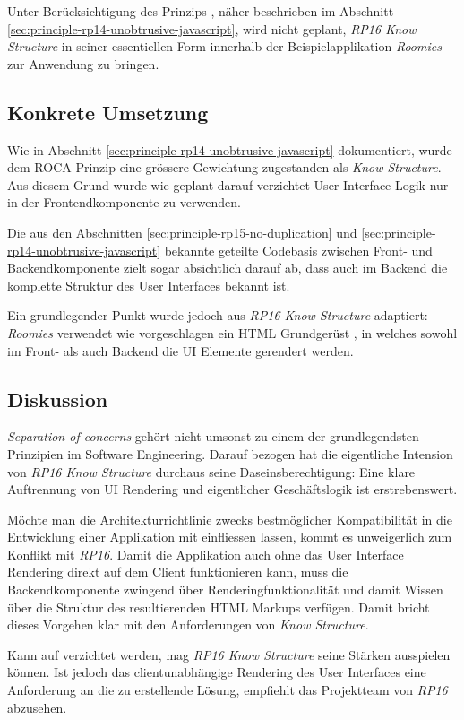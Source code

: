 Unter Berücksichtigung des Prinzips \emph{}, näher beschrieben im Abschnitt \ref{sec:principle-rp14-unobtrusive-javascript}, wird nicht geplant, \emph{RP16 Know Structure} in seiner essentiellen Form innerhalb der Beispielapplikation \emph{Roomies} zur Anwendung zu bringen.


\subsection*{Konkrete Umsetzung}

Wie in Abschnitt \ref{sec:principle-rp14-unobtrusive-javascript} dokumentiert, wurde dem ROCA Prinzip \emph{} eine grössere Gewichtung zugestanden als \emph{Know Structure}. Aus diesem Grund wurde wie geplant darauf verzichtet User Interface Logik nur in der Frontendkomponente zu verwenden.

Die aus den Abschnitten \ref{sec:principle-rp15-no-duplication} und \ref{sec:principle-rp14-unobtrusive-javascript} bekannte geteilte Codebasis zwischen Front- und Backendkomponente zielt sogar absichtlich darauf ab, dass auch im Backend die komplette Struktur des User Interfaces bekannt ist.

Ein grundlegender Punkt wurde jedoch aus \emph{RP16 Know Structure} adaptiert: \emph{Roomies} verwendet wie vorgeschlagen ein HTML Grundgerüst \cite{roomiesHtmlSkeleton}, in welches sowohl im Front- als auch Backend die UI Elemente gerendert werden.


\subsection*{Diskussion}

\emph{Separation of concerns} \cite{SeparationOfConcerns} gehört nicht umsonst zu einem der grundlegendsten Prinzipien im Software Engineering. Darauf bezogen hat die eigentliche Intension von \emph{RP16 Know Structure} durchaus seine Daseinsberechtigung: Eine klare Auftrennung von UI Rendering und eigentlicher Geschäftslogik ist erstrebenswert.

Möchte man die Architekturrichtlinie \emph{} zwecks bestmöglicher Kompatibilität in die Entwicklung einer Applikation mit einfliessen lassen, kommt es unweigerlich zum Konflikt mit \emph{RP16}. Damit die Applikation auch ohne das User Interface Rendering direkt auf dem Client funktionieren kann, muss die Backendkomponente zwingend über Renderingfunktionalität und damit Wissen über die Struktur des resultierenden HTML Markups verfügen. Damit bricht dieses Vorgehen klar mit den Anforderungen von \emph{Know Structure}.

Kann auf \emph{} verzichtet werden, mag \emph{RP16 Know Structure} seine Stärken ausspielen können. Ist jedoch das clientunabhängige Rendering des User Interfaces eine Anforderung an die zu erstellende Lösung, empfiehlt das Projektteam von \emph{RP16} abzusehen.

